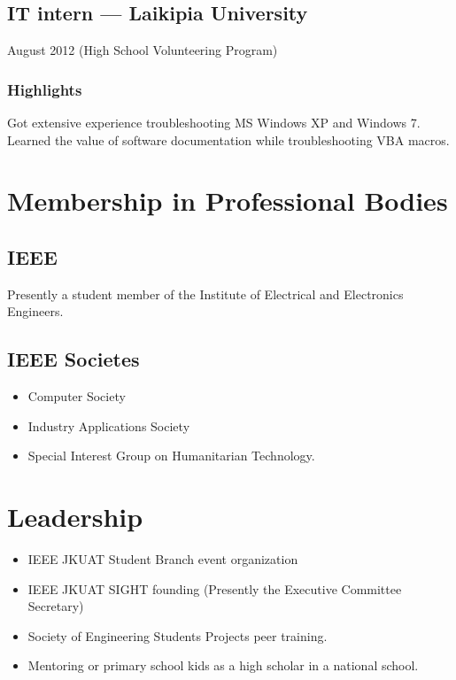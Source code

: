 \documentclass[a4paper,10pt]{article}
\begin{document}


\subsection{IT intern --- Laikipia University}
August 2012 (High School Volunteering Program)
\subsubsection{Highlights}
Got extensive experience troubleshooting MS Windows XP and Windows 7. Learned the value of software documentation while troubleshooting VBA macros.

\section{Membership in Professional Bodies}
\subsection{IEEE}
Presently a student member of the Institute of Electrical and Electronics Engineers.
\subsection{IEEE Societes}
\begin{itemize}
	\item Computer Society
	\item Industry Applications Society
	\item Special Interest Group on Humanitarian Technology.
\end{itemize}

\section{Leadership}
\begin{itemize}
	\item IEEE JKUAT Student Branch event organization
	\item IEEE JKUAT SIGHT founding (Presently the Executive Committee Secretary)
	\item Society of Engineering Students Projects peer training.
	\item Mentoring or primary school kids as a high scholar in a national school.
\end{itemize}
\end{document}
